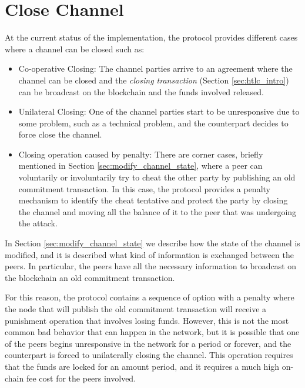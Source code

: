 \section{Close {\LN} Channel}
\label{sec:close_operation}

At the current status of the implementation, the {\LN} protocol provides different cases where a channel can be closed such as:

\begin{itemize}
  \item Co-operative Closing: The channel parties arrive to an agreement where the channel can be closed and the
        \emph{closing transaction} (Section \ref{sec:htlc_intro}) can be broadcast on the blockchain and the funds involved released.
  \item Unilateral Closing: One of the channel parties start to be unresponsive due to some problem, such as a technical problem, and the counterpart decides to force close the channel.
  
  \item Closing operation caused by penalty: There are corner cases, briefly mentioned in Section \ref{sec:modify_channel_state}, where a peer can voluntarily or involuntarily try to cheat the other party by publishing an old commitment transaction. In this case, the protocol provides a penalty mechanism to identify the cheat tentative and protect the party by closing the channel and moving all the balance of it to the peer that was undergoing the attack.
\end{itemize}

In Section \ref{sec:modify_channel_state} we describe how the state of the channel is modified, and it is described what kind of information is
exchanged between the peers. In particular, the peers have all the necessary information to broadcast on the blockchain an old commitment transaction.

For this reason, the protocol contains a sequence of option with a penalty where the node that will publish the old commitment transaction
will receive a punishment operation that involves losing funds. However, this is not the most common bad behavior that can happen in
the network, but it is possible that one of the peers begins unresponsive in the network for a period or forever, and the counterpart is forced to unilaterally closing the channel. This operation
requires that the funds are locked for an amount period, and it requires a much high on-chain fee cost for the peers involved.

